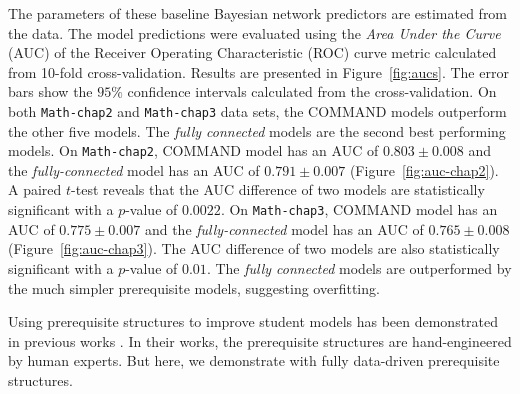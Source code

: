 \documentclass{edm_template}
\newcommand{\hl}[1]{\colorbox{yellow}{#1}}
\begin{document}
	The parameters of these baseline Bayesian network predictors are estimated from the data.
	The model predictions were evaluated using the \textit{Area Under the Curve} (AUC) of the Receiver Operating Characteristic (ROC) curve metric 
	calculated from 10-fold cross-validation.
	Results are presented in Figure~\ref{fig:aucs}. 
	The error bars show the $95\%$ confidence intervals calculated from the cross-validation.
	On both \texttt{Math-chap2} and \texttt{Math-chap3} data sets, the COMMAND models outperform the other five models.
	The \emph{fully connected} models are the second best performing models.
	On \texttt{Math-chap2}, COMMAND model has an AUC of $0.803\pm0.008$ and the \emph{fully-connected} model has an AUC of $0.791\pm0.007$ (Figure~\ref{fig:auc-chap2}).
	A paired $t$-test reveals that the AUC difference of two models are statistically significant with a $p$-value of $0.0022$.
	On \texttt{Math-chap3}, COMMAND model has an AUC of $0.775\pm0.007$ and the \emph{fully-connected} model has an AUC of $0.765\pm0.008$ (Figure~\ref{fig:auc-chap3}).
	The AUC difference of two models are also statistically significant with a $p$-value of $0.01$.
	The \emph{fully connected} models are outperformed by the much simpler prerequisite models, suggesting overfitting.
	
	Using prerequisite structures to improve student models has been demonstrated in previous works \cite{kaser2014beyond, botelho2015prediction}.
	In their works, the prerequisite structures are hand-engineered by human experts. But here, we demonstrate with fully data-driven prerequisite structures.
	
	
	
\end{document}
